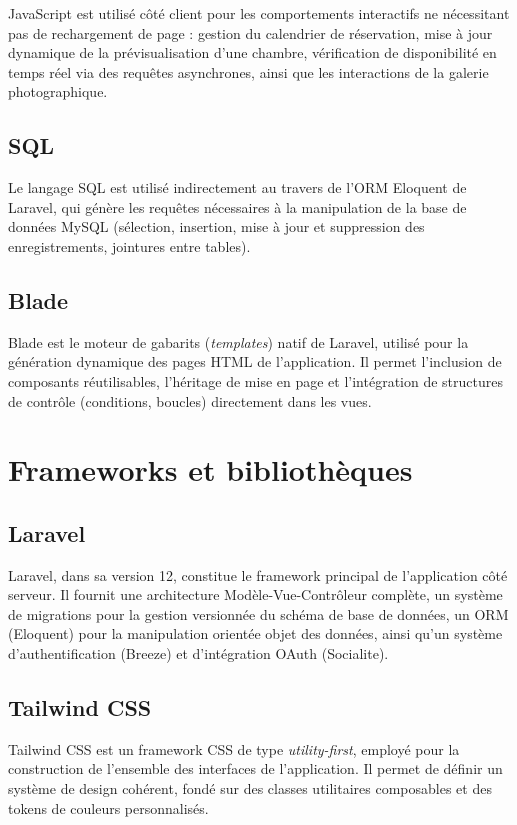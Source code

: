 \documentclass[12pt,a4paper]{report}
\begin{document}
JavaScript est utilisé côté client pour les comportements interactifs ne
nécessitant pas de rechargement de page : gestion du calendrier de
réservation, mise à jour dynamique de la prévisualisation d'une chambre,
vérification de disponibilité en temps réel via des requêtes
asynchrones, ainsi que les interactions de la galerie photographique.

\subsection{SQL}

Le langage SQL est utilisé indirectement au travers de l'ORM Eloquent de
Laravel, qui génère les requêtes nécessaires à la manipulation de la base
de données MySQL (sélection, insertion, mise à jour et suppression des
enregistrements, jointures entre tables).

\subsection{Blade}

Blade est le moteur de gabarits (\textit{templates}) natif de Laravel,
utilisé pour la génération dynamique des pages HTML de l'application. Il
permet l'inclusion de composants réutilisables, l'héritage de mise en page
et l'intégration de structures de contrôle (conditions, boucles)
directement dans les vues.

\section{Frameworks et bibliothèques}

\subsection{Laravel}

Laravel, dans sa version 12, constitue le framework principal de
l'application côté serveur. Il fournit une architecture
Modèle-Vue-Contrôleur complète, un système de migrations pour la gestion
versionnée du schéma de base de données, un ORM (Eloquent) pour la
manipulation orientée objet des données, ainsi qu'un système
d'authentification (Breeze) et d'intégration OAuth (Socialite).

\subsection{Tailwind CSS}

Tailwind CSS est un framework CSS de type \textit{utility-first}, employé
pour la construction de l'ensemble des interfaces de l'application. Il
permet de définir un système de design cohérent, fondé sur des classes
utilitaires composables et des tokens de couleurs personnalisés.
\end{document}
